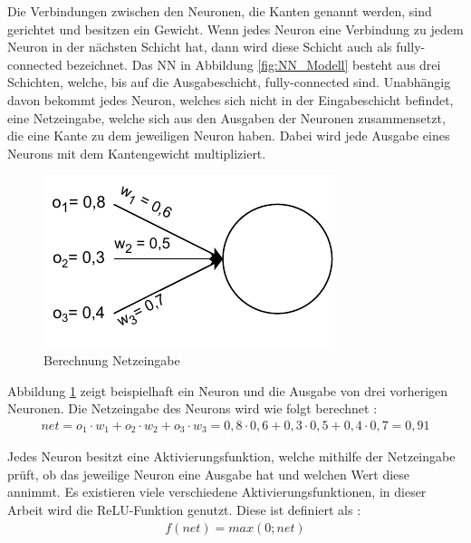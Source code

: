 Die Verbindungen zwischen den Neuronen, die Kanten genannt werden, sind gerichtet und besitzen ein Gewicht. Wenn jedes Neuron eine Verbindung zu jedem Neuron in der nächsten Schicht hat, 
dann wird diese Schicht auch als fully-connected bezeichnet. Das \ac{NN} in Abbildung \ref*{fig:NN_Modell} besteht aus drei Schichten, welche, bis auf die Ausgabeschicht, 
fully-connected sind. Unabhängig davon bekommt jedes Neuron, welches sich nicht in der Eingabeschicht befindet, eine Netzeingabe, welche sich aus den Ausgaben der Neuronen zusammensetzt, 
die eine Kante zu dem jeweiligen Neuron haben. Dabei wird jede Ausgabe eines Neurons mit dem Kantengewicht multipliziert.

\begin{figure}[H]
    \centering
    \includegraphics[width=\textwidth/2]{abbildungen/Aktivierungsfunktion.pdf}
    \caption{Berechnung Netzeingabe \cite[vgl. S.29]{NN}}
    \label{fig:Aktivierungsfunktion}
\end{figure}

Abbildung \ref*{fig:Aktivierungsfunktion} zeigt beispielhaft ein Neuron und die Ausgabe von drei vorherigen Neuronen. Die Netzeingabe des Neurons wird wie folgt berechnet \cite[S.29]{NN}:
\begin{align}
    net = o_{1} \cdot w_{1} + o_{2} \cdot w_{2} + o_{3} \cdot w_{3} = 0,8 \cdot 0,6 + 0,3 \cdot 0,5 + 0,4 \cdot 0,7 = 0,91
\end{align}

Jedes Neuron besitzt eine Aktivierungsfunktion, welche mithilfe der Netzeingabe prüft, ob das jeweilige Neuron eine Ausgabe hat und welchen Wert diese annimmt. Es existieren viele
verschiedene Aktivierungsfunktionen, in dieser Arbeit wird die \ac{ReLU}-Funktion genutzt. Diese ist definiert als \cite[S.31]{NN}:
\begin{align}
    f(net) = max(0; net)
\end{align}


